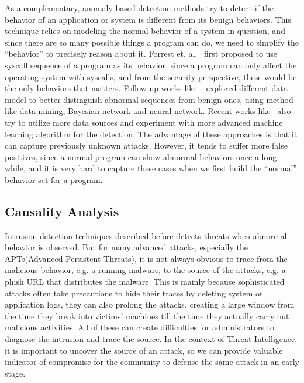 As a complementary, anomaly-based detection methods try to detect if
the behavior of an application or system is different from its benign
behaviors. This technique relies on modeling the normal behavior of a 
system in question, and since there are so many possible things a program 
can do, we need to simplify the ``behavior'' to precisely reason about 
it. Forrest et. al.~\cite{forrest1996sense} first proposed to use
syscall sequence of a program as its behavior, since a program can only
affect the operating system with syscalls, and from the security 
perspective, these would be the only behaviors that matters. Follow up
works like ~\cite{lee1998data, warrender1999detecting, mutz2006anomalous}
explored different data model to better distinguish abnormal sequences
from benign ones, using method like data mining, Bayesian network and 
neural network. Recent works like~\cite{du2017deeplog} also try to 
utilize more data sources and experiment with more advanced machine
learning algorithm for the detection. The advantage of these approaches 
is that it can capture previously unknown attacks. However, it tends
to suffer more false positives, since a normal program can show abnormal
behaviors once a long while, and it is very hard to capture these
cases when we first build the ``normal'' behavior set for a program.

\subsection{Causality Analysis}
Intrusion detection techniques described before detects threats 
when abnormal behavior is observed. But for many advanced 
attacks, especially the APTs(Advanced Persistent Threats), it 
is not always obvious to trace from the malicious behavior, e.g.
a running malware, to the source of the attacks, e.g. a phish 
URL that distributes the malware. This is mainly because sophisticated
attacks often take precautions to hide their traces by deleting
system or application logs, they can also prolong the attacks, 
creating a large window from the time they break into victims' 
machines till the time they actually carry out malicious activities. 
All of these can create difficulties for administrators to diagnose
the intrusion and trace the source. In the context of Threat 
Intelligence, it is important to uncover the source of 
an attack, so we can provide valuable indicator-of-compromise for the 
community to defense the same attack in an early stage.

